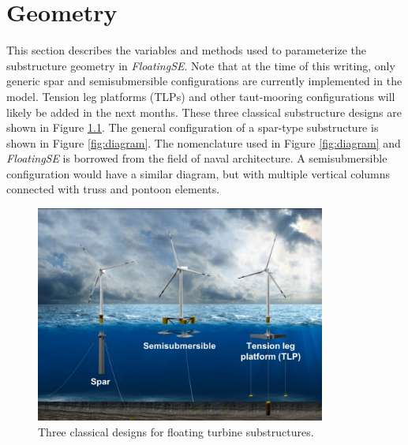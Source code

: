 \chapter{Geometry}
\label{sec:geom}
This section describes the variables and methods used to parameterize
the substructure geometry in \textit{FloatingSE}.  Note that at the time
of this writing, only generic spar and semisubmersible configurations
are currently implemented in the model.  Tension leg platforms (TLPs)
and other taut-mooring configurations will likely be added in the next
months.  These three classical substructure designs are shown in Figure
\ref{fig:archetype}.  The general configuration of a spar-type
substructure is shown in Figure \ref{fig:diagram}.  The nomenclature
used in Figure \ref{fig:diagram} and \textit{FloatingSE} is borrowed
from the field of naval architecture.  A semisubmersible configuration
would have a similar diagram, but with multiple vertical columns
connected with truss and pontoon elements.
%
\begin{figure}[htb]
  \begin{center}
    \includegraphics[width=3.75in]{figs/archetypes}
    \caption{Three classical designs for floating turbine substructures.}
    \label{fig:archetype}
  \end{center}
\end{figure}
%
